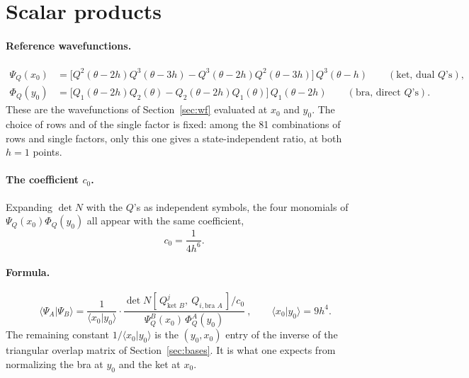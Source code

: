 \documentclass[11pt]{article}
\begin{document}
\section{Scalar products}\label{sec:norm}

\paragraph{Reference wavefunctions.}
\begin{align}
\Psi_Q(x_0)&=\big[Q^2(\theta-2h)Q^3(\theta-3h)-Q^3(\theta-2h)Q^2(\theta-3h)\big]\,Q^3(\theta-h)\qquad(\text{ket, dual }Q\text{'s}),\\
\Phi_Q(y_0)&=\big[Q_1(\theta-2h)Q_2(\theta)-Q_2(\theta-2h)Q_1(\theta)\big]\,Q_1(\theta-2h)\qquad(\text{bra, direct }Q\text{'s}).
\end{align}
These are the wavefunctions of Section~\ref{sec:wf} evaluated at $x_0$ and $y_0$. The choice of rows and of the single factor is fixed: among the 81 combinations of rows and single factors, only this one gives a state-independent ratio, at both $h=1$ points.

\paragraph{The coefficient $c_0$.} Expanding $\det N$ with the $Q$'s as independent symbols, the four monomials of $\Psi_Q(x_0)\Phi_Q(y_0)$ all appear with the same coefficient,
\begin{equation}
c_0=\frac1{4h^6}.
\end{equation}

\paragraph{Formula.}
\begin{equation}\label{eq:norm}
\boxed{\ \langle\Psi_A|\Psi_B\rangle=\frac{1}{\langle x_0|y_0\rangle}\cdot\frac{\det N[\,Q^j_{\text{ket }B},\ Q_{i,\text{bra }A}\,]/c_0}{\Psi_Q^{B}(x_0)\,\Phi_Q^{A}(y_0)}\ },\qquad \langle x_0|y_0\rangle=9h^4 .
\end{equation}
The remaining constant $1/\langle x_0|y_0\rangle$ is the $(y_0,x_0)$ entry of the inverse of the triangular overlap matrix of Section~\ref{sec:bases}. It is what one expects from normalizing the bra at $y_0$ and the ket at $x_0$.
\end{document}
